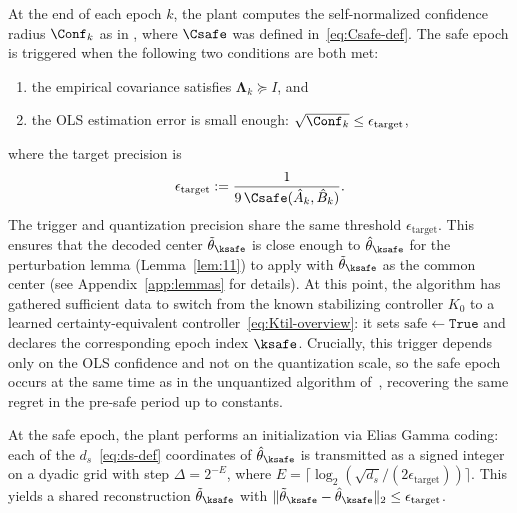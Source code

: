 \documentclass[11pt,journal,onecolumn]{IEEEtran}
\begin{document}
At the end of each epoch \(k\), the plant computes the self-normalized confidence radius
\(\Conf_k\) as in \cite{simchowitz20a}, where $\Csafe$ was defined in~\eqref{eq:Csafe-def}.
The safe epoch is triggered when the following two conditions are both met:
\begin{enumerate}
    \item the empirical covariance satisfies $\mathbf{\Lambda}_k \succeq I$, and
    \item the OLS estimation error is small enough: $\sqrt{\Conf_k} \le \epsilon_{\mathrm{target}}$,
\end{enumerate}
where the target precision is
\begin{equation} \label{eq:eps-target-def}
    \epsilon_{\mathrm{target}} := \frac{1}{9\,\Csafe(\hat A_k,\hat B_k)}.
\end{equation}
The trigger and quantization precision share the same threshold $\epsilon_{\mathrm{target}}$.
This ensures that the decoded center $\tilde\theta_{\ksafe}$ is close enough to $\hat\theta_{\ksafe}$ for the
perturbation lemma (Lemma~\ref{lem:11}) to apply with $\tilde\theta_{\ksafe}$ as the common center
(see Appendix~\ref{app:lemmas} for details).
At this point, the algorithm has gathered sufficient data to switch from the known stabilizing controller $K_0$ to a learned certainty-equivalent controller~\eqref{eq:Ktil-overview}: it sets \(\mathrm{safe}\gets\mathtt{True}\) and declares the corresponding epoch index \(\ksafe\).
Crucially, this trigger depends only on the OLS confidence and not on the quantization scale, so the safe epoch occurs at the same time as in the unquantized algorithm of~\cite{simchowitz20a}, recovering the same regret in the pre-safe period up to constants.

At the safe epoch, the plant performs an initialization via Elias Gamma coding: each of the $d_s$~\eqref{eq:ds-def} coordinates of $\hat\theta_{\ksafe}$ is transmitted as a signed integer on a dyadic grid with step $\Delta = 2^{-E}$, where $E = \lceil\log_2(\sqrt{d_s}/(2\epsilon_{\mathrm{target}}))\rceil$. This yields a shared reconstruction $\tilde\theta_{\ksafe}$ with $\|\tilde\theta_{\ksafe} - \hat\theta_{\ksafe}\|_2 \le \epsilon_{\mathrm{target}}$.
\end{document}
